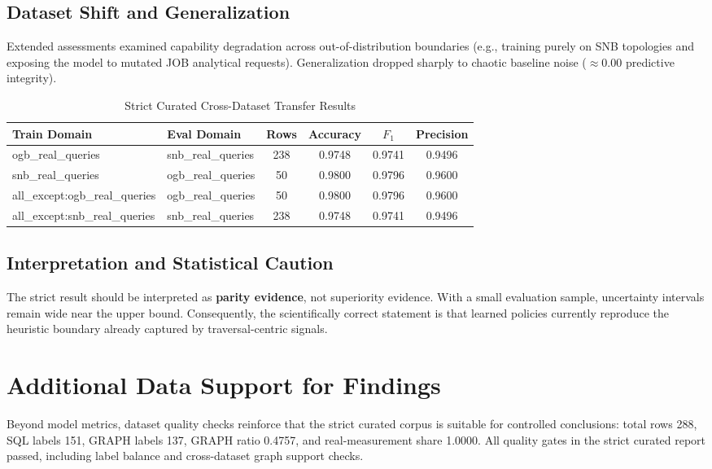\documentclass[conference]{IEEEtran}
\begin{document}
\subsection{Dataset Shift and Generalization}
Extended assessments examined capability degradation across out-of-distribution boundaries (e.g., training purely on SNB topologies and exposing the model to mutated JOB analytical requests). Generalization dropped sharply to chaotic baseline noise ($\approx 0.00$ predictive integrity). 

\begin{table}[h]
\centering
\caption{Strict Curated Cross-Dataset Transfer Results}
\label{tab:shift_strict_curated}
\begin{tabularx}{\columnwidth}{lXcccc}
\toprule
Train Domain & Eval Domain & Rows & Accuracy & $F_1$ & Precision \\
\midrule
ogb\_real\_queries & snb\_real\_queries & 238 & 0.9748 & 0.9741 & 0.9496 \\
snb\_real\_queries & ogb\_real\_queries & 50 & 0.9800 & 0.9796 & 0.9600 \\
all\_except:ogb\_real\_queries & ogb\_real\_queries & 50 & 0.9800 & 0.9796 & 0.9600 \\
all\_except:snb\_real\_queries & snb\_real\_queries & 238 & 0.9748 & 0.9741 & 0.9496 \\
\bottomrule
\end{tabularx}
\end{table}

\subsection{Interpretation and Statistical Caution}
The strict result should be interpreted as \textbf{parity evidence}, not superiority evidence. With a small evaluation sample, uncertainty intervals remain wide near the upper bound. Consequently, the scientifically correct statement is that learned policies currently reproduce the heuristic boundary already captured by traversal-centric signals.

\section{Additional Data Support for Findings}
Beyond model metrics, dataset quality checks reinforce that the strict curated corpus is suitable for controlled conclusions: total rows 288, SQL labels 151, GRAPH labels 137, GRAPH ratio 0.4757, and real-measurement share 1.0000. All quality gates in the strict curated report passed, including label balance and cross-dataset graph support checks.
\end{document}
